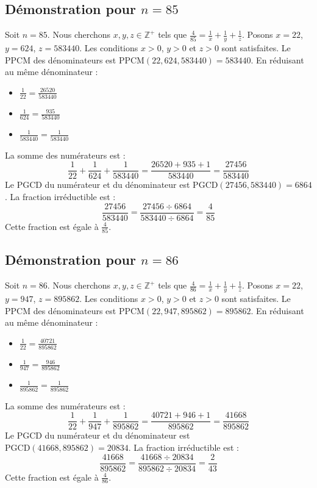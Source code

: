 \documentclass[11pt,a4paper]{article}
\begin{document}
\subsection{Démonstration pour $n = 85$}
Soit $n = 85$. Nous cherchons $x, y, z \in \mathbb{Z}^{+}$ tels que $\frac{4}{85} = \frac{1}{x} + \frac{1}{y} + \frac{1}{z}$.
Posons $x = 22$, $y = 624$, $z = 583440$.
Les conditions $x > 0$, $y > 0$ et $z > 0$ sont satisfaites.
Le PPCM des dénominateurs est $\text{PPCM}(22, 624, 583440) = 583440$.
En réduisant au même dénominateur :
\begin{itemize}
    \item $\frac{1}{22} = \frac{26520}{583440}$
    \item $\frac{1}{624} = \frac{935}{583440}$
    \item $\frac{1}{583440} = \frac{1}{583440}$
\end{itemize}
La somme des numérateurs est :
$$ \frac{1}{22} + \frac{1}{624} + \frac{1}{583440} = \frac{26520 + 935 + 1}{583440} = \frac{27456}{583440} $$
Le PGCD du numérateur et du dénominateur est $\text{PGCD}(27456, 583440) = 6864$.
La fraction irréductible est :
$$ \frac{27456}{583440} = \frac{27456 \div 6864}{583440 \div 6864} = \frac{4}{85} $$
Cette fraction est égale à $\frac{4}{85}$.

\subsection{Démonstration pour $n = 86$}
Soit $n = 86$. Nous cherchons $x, y, z \in \mathbb{Z}^{+}$ tels que $\frac{4}{86} = \frac{1}{x} + \frac{1}{y} + \frac{1}{z}$.
Posons $x = 22$, $y = 947$, $z = 895862$.
Les conditions $x > 0$, $y > 0$ et $z > 0$ sont satisfaites.
Le PPCM des dénominateurs est $\text{PPCM}(22, 947, 895862) = 895862$.
En réduisant au même dénominateur :
\begin{itemize}
    \item $\frac{1}{22} = \frac{40721}{895862}$
    \item $\frac{1}{947} = \frac{946}{895862}$
    \item $\frac{1}{895862} = \frac{1}{895862}$
\end{itemize}
La somme des numérateurs est :
$$ \frac{1}{22} + \frac{1}{947} + \frac{1}{895862} = \frac{40721 + 946 + 1}{895862} = \frac{41668}{895862} $$
Le PGCD du numérateur et du dénominateur est $\text{PGCD}(41668, 895862) = 20834$.
La fraction irréductible est :
$$ \frac{41668}{895862} = \frac{41668 \div 20834}{895862 \div 20834} = \frac{2}{43} $$
Cette fraction est égale à $\frac{4}{86}$.
\end{document}
